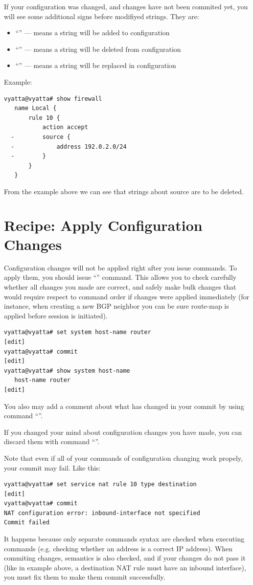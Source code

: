 \discussion
If your configuration was changed, and changes have not been commited yet, you will see some additional signs
before modifiyed strings. They are:
\begin{itemize}
 \item ``\console{+}'' --- means a string will be added to configuration
 \item ``\console{-}'' --- means a string will be deleted from configuration
 \item ``\console{>}'' --- means a string will be replaced in configuration
\end{itemize}
Example:
\begin{verbatim}
vyatta@vyatta# show firewall 
   name Local {
       rule 10 {
           action accept
  -        source {
  -            address 192.0.2.0/24
  -        }
       }
   }
\end{verbatim}
From the example above we can see that strings about source are to be deleted.

\section{Recipe: Apply Configuration Changes}
\solution
Configuration changes will not be applied right after you issue commands. To apply them, you should issue 
``'' command. This allows you to check carefully whether all changes you made are correct, and
safely make bulk changes that would require respect to command order if changes were applied immediately
(for instance, when creating a new BGP neighbor you can be sure route-map is applied before session is initiated).
\begin{verbatim}
vyatta@vyatta# set system host-name router
[edit]
vyatta@vyatta# commit
[edit]
vyatta@vyatta# show system host-name 
   host-name router
[edit]
\end{verbatim}

You also may add a comment about what has changed in your commit by using command 
``''.

If you changed your mind about configuration changes you have made, you can discard them with command 
``''.


\discussion
Note that even if all of your commands of configuration changing work propely, your commit may fail. Like this:
\begin{verbatim}
vyatta@vyatta# set service nat rule 10 type destination 
[edit]
vyatta@vyatta# commit
NAT configuration error: inbound-interface not specified
Commit failed
\end{verbatim}
It happens because only separate commands syntax are checked when executing commands (e.g. checking 
whether an address is a correct IP address). When commiting changes, semantics is also checked, and if your
changes do not pass it (like in example above, a destination NAT rule must have an inbound interface), you must
fix them to make them commit successfully.

